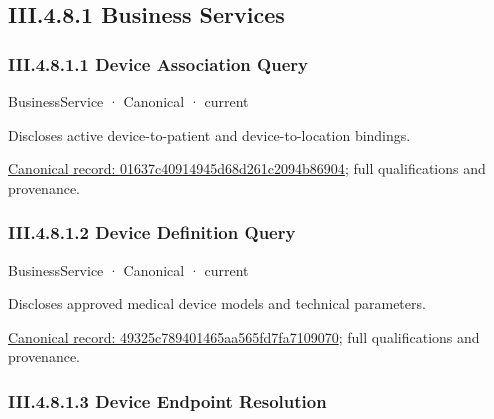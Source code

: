 \subsection*{III.4.8.1 Business Services}
\label{navigation:III.4.8.1}

\subsubsection*{III.4.8.1.1 Device Association Query}
\label{navigation:III.4.8.1.1}

\label{element:01637c40914945d68d261c2094b86904}
{\small BusinessService · Canonical · current}\par

Discloses active device-to-patient and device-to-location bindings.


{\footnotesize \href{../../../../continuum/business/business-service/01637c40914945d68d261c2094b86904.md}{Canonical record: 01637c40914945d68d261c2094b86904}; full qualifications and provenance.}\par
\subsubsection*{III.4.8.1.2 Device Definition Query}
\label{navigation:III.4.8.1.2}

\label{element:49325c789401465aa565fd7fa7109070}
{\small BusinessService · Canonical · current}\par

Discloses approved medical device models and technical parameters.


{\footnotesize \href{../../../../continuum/business/business-service/49325c789401465aa565fd7fa7109070.md}{Canonical record: 49325c789401465aa565fd7fa7109070}; full qualifications and provenance.}\par
\subsubsection*{III.4.8.1.3 Device Endpoint Resolution}
\label{navigation:III.4.8.1.3}

